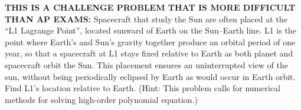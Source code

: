 \documentclass{../../oss-apphys-exam}
\begin{document}
\begin{questions}
  \newpage
  
  \question\textbf{THIS IS A CHALLENGE PROBLEM THAT IS MORE DIFFICULT THAN AP
    EXAMS:} Spacecraft that study the Sun are often placed at the ``L1 Lagrange
  Point'', located sunward of Earth on the Sun--Earth line. L1 is the point
  where Earth's and Sun's gravity together produce an orbital period of one
  year, so that a spacecraft at L1 stays fixed relative to Earth as both planet
  and spacecraft orbit the Sun. This placement ensures an uninterrupted view of
  the sun, without being periodically eclipsed by Earth as would occur in Earth
  orbit. Find L1's location relative to Earth. (Hint: This problem calls for
  numerical methods for solving high-order polynomial equation.)

\end{questions}
\end{document}
